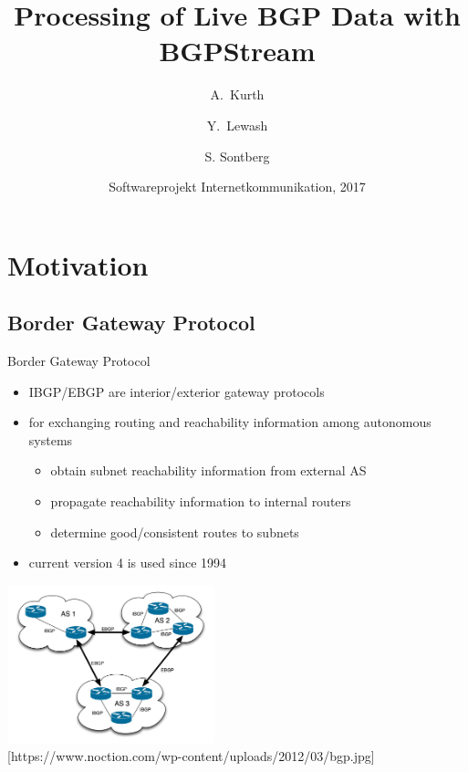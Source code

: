 \documentclass[ucs,9pt]{beamer}
\title[BGP Data] %
{Processing of Live BGP Data with BGPStream}
\author[Author, Another] %
{A.~Kurth \and Y.~Lewash \and S. Sontberg}
\institute[FU Berlin] %
{Freie Universität Berlin}
\date[SWP 2017] %
{Softwareprojekt Internetkommunikation, 2017}
\begin{document}
\begin{frame}[plain]
  \titlepage
\end{frame}


\section{Motivation}

\subsection{Border Gateway Protocol}

\begin{frame}{Border Gateway Protocol}%
  \begin{itemize}
  \item
    IBGP/EBGP are interior/exterior gateway protocols
  \item
    for exchanging routing and reachability information among autonomous systems
    \begin{itemize}
    \item
      obtain subnet reachability information from external AS
    \item
      propagate reachability information to internal routers
    \item
      determine good/consistent routes to subnets
    \end{itemize}
  \item
    current version 4 is used since 1994
  \end{itemize}
  \pause
  \centering\includegraphics[width=6cm]{bgp}\\
  \tiny{[https://www.noction.com/wp-content/uploads/2012/03/bgp.jpg]}
\end{frame}
\end{document}
